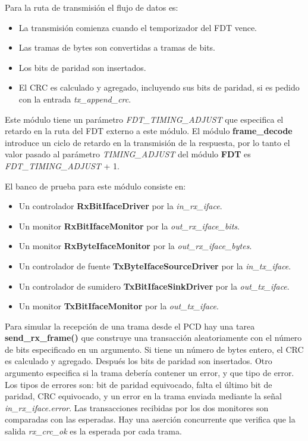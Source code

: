 \documentclass[a4paper, twoside, 11pt]{report}
\begin{document}
Para la ruta de transmisión el flujo de datos es:

\begin{itemize}
  \item La transmisión comienza cuando el temporizador del FDT vence.
  \item Las tramas de bytes son convertidas a tramas de bits.
  \item Los bits de paridad son insertados.
  \item El CRC es calculado y agregado, incluyendo sus bits de paridad, si es pedido con la entrada \textit{tx\_append\_crc}.
\end{itemize}

Este módulo tiene un parámetro \textit{FDT\_TIMING\_ADJUST} que especifica el retardo en la ruta del FDT externo a este módulo. El módulo \textbf{frame\_decode} introduce un ciclo de retardo en la transmisión de la respuesta, por lo tanto el valor pasado al parámetro \textit{TIMING\_ADJUST} del módulo \textbf{FDT} es \textit{FDT\_TIMING\_ADJUST} + 1.

El banco de prueba para este módulo consiste en:

\begin{itemize}
  \item Un controlador \textbf{RxBitIfaceDriver} por la \textit{in\_rx\_iface}.
  \item Un monitor \textbf{RxBitIfaceMonitor} por la \textit{out\_rx\_iface\_bits}.
  \item Un monitor \textbf{RxByteIfaceMonitor} por la \textit{out\_rx\_iface\_bytes}.
  \item Un controlador de fuente \textbf{TxByteIfaceSourceDriver} por la \textit{in\_tx\_iface}.
  \item Un controlador de sumidero \textbf{TxBitIfaceSinkDriver} por la \textit{out\_tx\_iface}.
  \item Un monitor \textbf{TxBitIfaceMonitor} por la \textit{out\_tx\_iface}.
\end{itemize}

Para simular la recepción de una trama desde el PCD hay una tarea \textbf{send\_rx\_frame()} que construye una transacción aleatoriamente con el número de bits especificado en un argumento. Si tiene un número de bytes entero, el CRC es calculado y agregado. Después los bits de paridad son insertados. Otro argumento especifica si la trama debería contener un error, y que tipo de error. Los tipos de errores son: bit de paridad equivocado, falta el último bit de paridad, CRC equivocado, y un error en la trama enviada mediante la señal \textit{in\_rx\_iface.error}. Las transacciones recibidas por los dos monitores son comparadas con las esperadas. Hay una aserción concurrente que verifica que la salida \textit{rx\_crc\_ok} es la esperada por cada trama.
\end{document}
